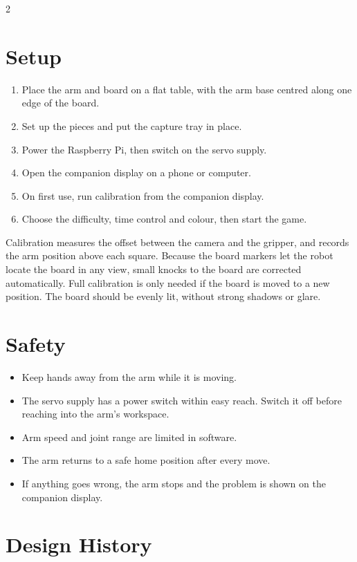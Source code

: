 \documentclass[10pt,a4paper]{article}
\begin{document}
\begin{multicols}{2}
\section{Setup}
\begin{enumerate}
  \item Place the arm and board on a flat table, with the arm base centred along one edge of the board.
  \item Set up the pieces and put the capture tray in place.
  \item Power the Raspberry Pi, then switch on the servo supply.
  \item Open the companion display on a phone or computer.
  \item On first use, run calibration from the companion display.
  \item Choose the difficulty, time control and colour, then start the game.
\end{enumerate}
Calibration measures the offset between the camera and the gripper, and records the arm
position above each square. Because the board markers let the robot locate the board in any
view, small knocks to the board are corrected automatically. Full calibration is only needed if
the board is moved to a new position. The board should be evenly lit, without strong shadows or glare.

\section{Safety}
\begin{itemize}
  \item Keep hands away from the arm while it is moving.
  \item The servo supply has a power switch within easy reach. Switch it off before reaching into the arm's workspace.
  \item Arm speed and joint range are limited in software.
  \item The arm returns to a safe home position after every move.
  \item If anything goes wrong, the arm stops and the problem is shown on the companion display.
\end{itemize}

\section{Design History}


\end{multicols}
\end{document}
